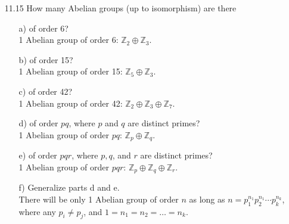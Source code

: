 \documentclass[12pt]{article}
\begin{document}
\begin{enumerate}
\item[11.15] How many Abelian groups (up to isomorphism) are there
\begin{enumerate}
\item[a)] of order 6? \\ 
1 Abelian group of order 6: $\mathbb{Z}_2 \oplus \mathbb{Z}_3$.
\item[b)] of order 15? \\
1 Abelian group of order 15: $\mathbb{Z}_5 \oplus \mathbb{Z}_3$.
\item[c)] of order 42? \\
1 Abelian group of order 42: $\mathbb{Z}_2 \oplus \mathbb{Z}_3 \oplus \mathbb{Z}_7$.
\item[d)] of order $pq$, where $p$ and $q$ are distinct primes? \\
1 Abelian group of order $pq$: $\mathbb{Z}_p \oplus \mathbb{Z}_q$.
\item[e)] of order $pqr$, where $p, q$, and $r$ are distinct primes? \\
1 Abelian group of order $pqr$: $\mathbb{Z}_p \oplus \mathbb{Z}_q \oplus \mathbb{Z}_r$.
\item[f)] Generalize parts d and e. \\
There will be only 1 Abelian group of order $n$ as long as $n = p_1^{n_1}p_2^{n_1} \cdots
p_k^{n_k}$, where any $p_i \neq p_j$, and $1 = n_1 = n_2 = \ldots = n_k$.
\end{enumerate}


\end{enumerate}
\end{document}
